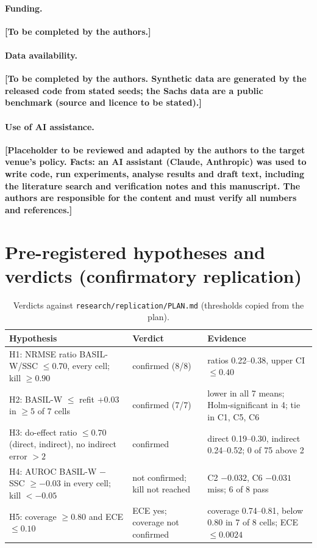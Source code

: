 \documentclass[11pt,a4paper]{article}
\newcommand{\placeholder}[1]{\textbf{[#1]}}
\begin{document}
\paragraph{Funding.} \placeholder{To be completed by the authors.}
\paragraph{Data availability.} \placeholder{To be completed by the authors. Synthetic data are generated by the released code from stated seeds; the Sachs data are a public benchmark (source and licence to be stated).}
\paragraph{Use of AI assistance.} \placeholder{Placeholder to be reviewed and adapted by the authors to the target venue's policy. Facts: an AI assistant (Claude, Anthropic) was used to write code, run experiments, analyse results and draft text, including the literature search and verification notes and this manuscript. The authors are responsible for the content and must verify all numbers and references.}




\appendix
\section{Pre-registered hypotheses and verdicts (confirmatory replication)}
\label{app:hyp}
\begin{table}[h]
\centering
\caption{Verdicts against \texttt{research/replication/PLAN.md} (thresholds copied from the plan).}
\small
\begin{tabular}{@{}p{4.8cm}p{3.3cm}p{6.6cm}@{}}
\toprule
Hypothesis & Verdict & Evidence \\
\midrule
H1: NRMSE ratio BASIL-W/SSC $\le0.70$, every cell; kill $\ge0.90$ & confirmed (8/8) & ratios 0.22--0.38, upper CI $\le0.40$ \\
H2: BASIL-W $\le$ refit $+0.03$ in $\ge5$ of 7 cells & confirmed (7/7) & lower in all 7 means; Holm-significant in 4; tie in C1, C5, C6 \\
H3: do-effect ratio $\le0.70$ (direct, indirect), no indirect error $>2$ & confirmed & direct 0.19--0.30, indirect 0.24--0.52; 0 of 75 above 2 \\
H4: AUROC BASIL-W $-$ SSC $\ge-0.03$ in every cell; kill $<-0.05$ & not confirmed; kill not reached & C2 $-0.032$, C6 $-0.031$ miss; 6 of 8 pass \\
H5: coverage $\ge0.80$ and ECE $\le0.10$ & ECE yes; coverage not confirmed & coverage 0.74--0.81, below 0.80 in 7 of 8 cells; ECE $\le0.0024$ \\
\bottomrule
\end{tabular}
\end{table}
\end{document}
